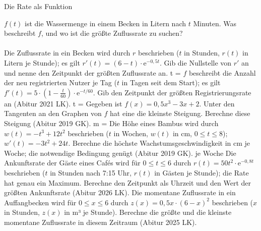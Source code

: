 \setcounter{aufgabe}{18}

\begin{aufgabe}{Die Rate als Funktion}
\begin{teile}
\teil $f(t)$ ist die Wassermenge in einem Becken in Litern nach $t$ Minuten. Was beschreibt $f$, und wo ist die größte Zuflussrate zu suchen? \\  \\ 
\teil Die Zuflussrate in ein Becken wird durch $r$ beschrieben ($t$ in Stunden, $r(t)$ in Litern je Stunde); es gilt $r'(t) = (6 - t) \cdot \mathrm{e}^{-0{,}5t}$. Gib die Nullstelle von $r'$ an und nenne den Zeitpunkt der größten Zuflussrate an. t = \leerfeld
\teil $f$ beschreibt die Anzahl der neu registrierten Nutzer je Tag ($t$ in Tagen seit dem Start); es gilt $f'(t) = 5 \cdot (1 - \frac{t}{60}) \cdot \mathrm{e}^{-t/60}$. Gib den Zeitpunkt der größten Registrierungsrate an \hfill (Abitur 2021 LK). t = \leerfeld
\teil Gegeben ist $f(x) = 0{,}5x^3 - 3x + 2$. Unter den Tangenten an den Graphen von $f$ hat eine die kleinste Steigung. Berechne diese Steigung \hfill (Abitur 2019 GK). m = \leerfeld
\teil Die Höhe eines Bambus wird durch $w(t) = -t^3 + 12t^2$ beschrieben ($t$ in Wochen, $w(t)$ in cm, $0 \le t \le 8$); $w'(t) = -3t^2 + 24t$. Berechne die höchste Wachstumsgeschwindigkeit in cm je Woche; die notwendige Bedingung genügt \hfill (Abitur 2019 GK). \leerfeld[cm] je Woche
\teil Die Ankunftsrate der Gäste eines Cafés wird für $0 \le t \le 6$ durch $r(t) = 50t^2 \cdot \mathrm{e}^{-0{,}8t}$ beschrieben ($t$ in Stunden nach 7:15 Uhr, $r(t)$ in Gästen je Stunde); die Rate hat genau ein Maximum. Berechne den Zeitpunkt als Uhrzeit und den Wert der größten Ankunftsrate \hfill (Abitur 2026 LK).
\teil Die momentane Zuflussrate in ein Auffangbecken wird für $0 \le x \le 6$ durch $z(x) = 0{,}5x \cdot (6 - x)^2$ beschrieben ($x$ in Stunden, $z(x)$ in m³ je Stunde). Berechne die größte und die kleinste momentane Zuflussrate in diesem Zeitraum \hfill (Abitur 2025 LK).

\end{teile}
\end{aufgabe}
